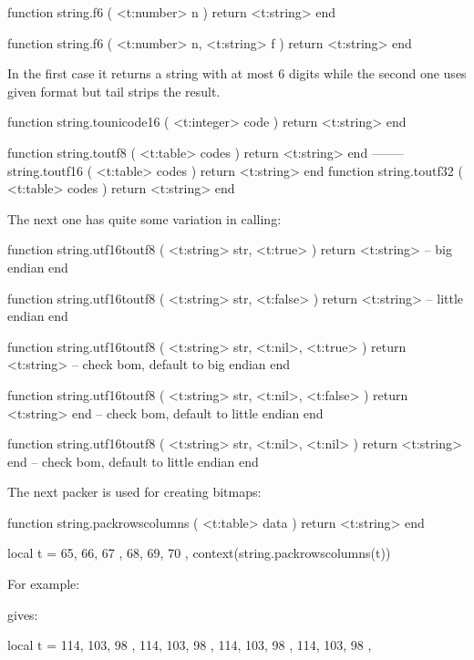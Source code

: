 \starttyping[option=LUA]
function string.f6 ( <t:number> n )
    return <t:string>
end

function string.f6 ( <t:number> n,  <t:string> f )
    return <t:string>
end
\stoptyping

In the first case it returns a string with at most 6 digits while the second one
uses given format but tail strips the result.

\starttyping[option=LUA]
function string.tounicode16 ( <t:integer> code  ) return <t:string> end
\stoptyping

\starttyping[option=LUA]
function string.toutf8  ( <t:table>   codes ) return <t:string> end
-------- string.toutf16 ( <t:table>   codes ) return <t:string> end
function string.toutf32 ( <t:table>   codes ) return <t:string> end
\stoptyping

The next one has quite some variation in calling:

\starttyping[option=LUA]
function string.utf16toutf8 ( <t:string> str, <t:true> )
    return <t:string>  -- big endian
end
\stoptyping

\starttyping[option=LUA]
function string.utf16toutf8 ( <t:string> str, <t:false> )
    return <t:string> -- little endian
end
\stoptyping

\starttyping[option=LUA]
function string.utf16toutf8 ( <t:string> str, <t:nil>, <t:true> )
    return <t:string> -- check bom, default to big endian
end
\stoptyping

\starttyping[option=LUA]
function string.utf16toutf8 ( <t:string> str, <t:nil>, <t:false> )
    return <t:string> end -- check bom, default to little endian
end
\stoptyping

\starttyping[option=LUA]
function string.utf16toutf8 ( <t:string> str, <t:nil>, <t:nil> )
    return <t:string> end -- check bom, default to little endian
end
\stoptyping

The next packer is used for creating bitmaps:

\starttyping[option=LUA]
function string.packrowscolumns ( <t:table> data )
    return <t:string>
end
\stoptyping

\startbuffer
\startluacode
local t = {
    { 65, 66, 67 },
    { 68, 69, 70 },
}
context(string.packrowscolumns(t))
\stopluacode
\stopbuffer

For example:

\typebuffer

gives: \inlinebuffer

\startbuffer
\startluacode
local t = {
    { { 114, 103, 98 }, { 114, 103, 98 } },
    { { 114, 103, 98 }, { 114, 103, 98 } },
}

